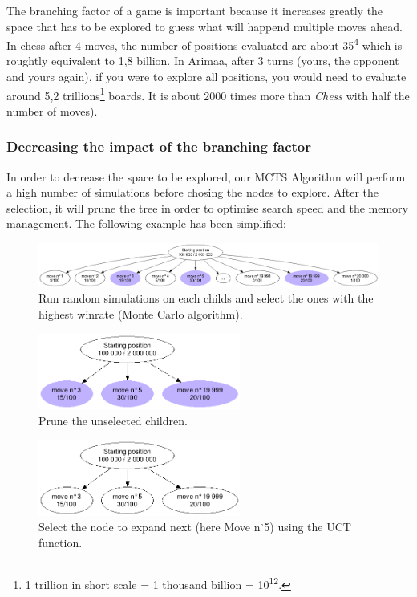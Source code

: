 The branching factor of a game is important because it increases greatly the space that has to be explored to guess what will happend multiple moves ahead. In chess after 4 moves, the number of positions evaluated are about 35\textsuperscript{4} which is roughtly equivalent to 1,8 billion. In Arimaa, after 3 turns (yours, the opponent and yours again), if you were to explore all positions, you would need to evaluate around 5,2 trillions\footnote{1 trillion in short scale = 1 thousand billion = 10\textsuperscript{12}.} boards. It is about 2000 times more than \textit{Chess} with half the number of moves).

\subsubsection{Decreasing the impact of the branching factor}

In order to decrease the space to be explored, our MCTS Algorithm will perform a high number of simulations before chosing the nodes to explore. After the selection, it will prune the tree in order to optimise search speed and the memory management. The following example has been simplified:
\begin{figure}[H]
\centering
	\includegraphics[width=\textwidth]{3Methods/3.2MCTS/img/root.png}
	\caption{\label{fig:roottree}Run random simulations on each childs and select the ones with the highest winrate (Monte Carlo algorithm).}
\end{figure}

\begin{figure}[H]
\centering
	\includegraphics[height=2.5cm]{3Methods/3.2MCTS/img/prune.png}
	\caption{\label{fig:prune}Prune the unselected children.}
\end{figure}

\begin{figure}[H]
\centering
	\includegraphics[height=2.5cm]{3Methods/3.2MCTS/img/prune-clean.png}
	\caption{\label{fig:prune-clean}Select the node to expand next (here Move n$^{\circ}$5) using the UCT function.}
\end{figure}

